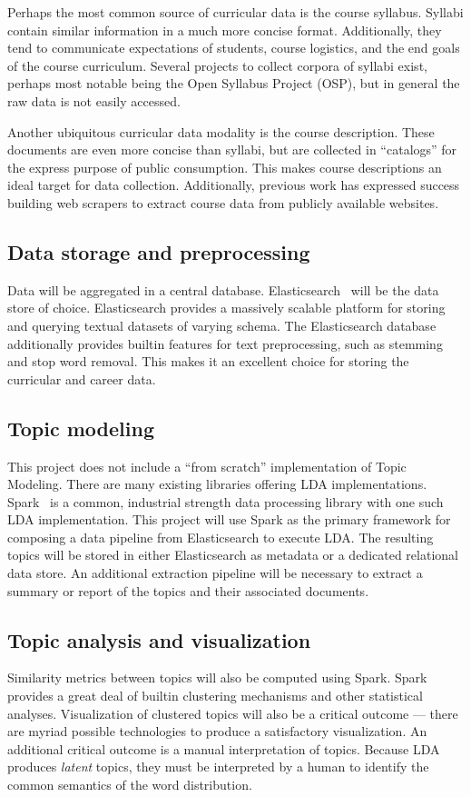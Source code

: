 Perhaps the most common source of curricular data is the course syllabus.
Syllabi contain similar information in a much more concise format.
Additionally, they tend to communicate expectations of students, course logistics, and the end goals of the course curriculum.
Several projects to collect corpora of syllabi exist, perhaps most notable being the Open Syllabus Project (OSP), but in general the raw data is not easily accessed.

Another ubiquitous curricular data modality is the course description.
These documents are even more concise than syllabi, but are collected in ``catalogs'' for the express purpose of public consumption.
This makes course descriptions an ideal target for data collection.
Additionally, previous work has expressed success building web scrapers to extract course data from publicly available websites.~\cite{rouly2015}

\subsection{Data storage and preprocessing}

Data will be aggregated in a central database.
Elasticsearch~\cite{elasticsearch} will be the data store of choice.
Elasticsearch provides a massively scalable platform for storing and querying textual datasets of varying schema.
The Elasticsearch database additionally provides builtin features for text preprocessing, such as stemming and stop word removal.
This makes it an excellent choice for storing the curricular and career data.

\subsection{Topic modeling}

This project does not include a ``from scratch'' implementation of Topic Modeling.
There are many existing libraries offering LDA implementations.
Spark~\cite{spark} is a common, industrial strength data processing library with one such LDA implementation.
This project will use Spark as the primary framework for composing a data pipeline from Elasticsearch to execute LDA\@.
The resulting topics will be stored in either Elasticsearch as metadata or a dedicated relational data store.
An additional extraction pipeline will be necessary to extract a summary or report of the topics and their associated documents.

\subsection{Topic analysis and visualization}

Similarity metrics between topics will also be computed using Spark.
Spark provides a great deal of builtin clustering mechanisms and other statistical analyses.
Visualization of clustered topics will also be a critical outcome --- there are myriad possible technologies to produce a satisfactory visualization.
An additional critical outcome is a manual interpretation of topics.
Because LDA produces \textit{latent} topics, they must be interpreted by a human to identify the common semantics of the word distribution.
